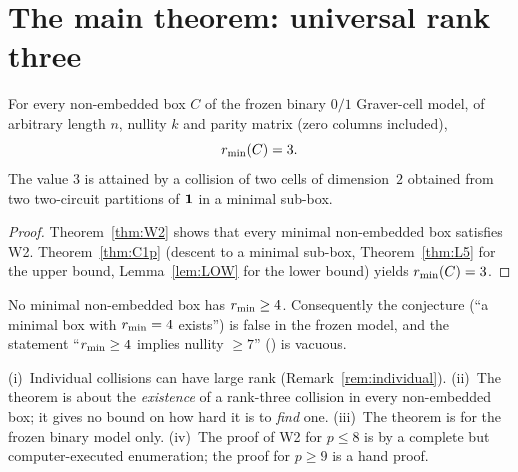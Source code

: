 
\section{The main theorem: universal rank three}\label{sec:main}

\begin{theorem}\label{thm:rank3}
For every non-embedded box $C$ of the frozen binary $0/1$ Graver-cell model, of arbitrary length $n$, nullity $k$ and parity matrix (zero columns included),
\[
r_{\min}(C)=3 .
\]
The value $3$ is attained by a collision of two cells of dimension~$2$ obtained from two two-circuit partitions of $\mathbf 1$ in a minimal sub-box.
\end{theorem}

\begin{proof}
Theorem~\ref{thm:W2} shows that every minimal non-embedded box satisfies W2. Theorem~\ref{thm:C1p} (descent to a minimal sub-box, Theorem~\ref{thm:L5} for the upper bound, Lemma~\ref{lem:LOW} for the lower bound) yields $r_{\min}(C)=3$.
\end{proof}


\begin{corollary}\label{cor:no4}
No minimal non-embedded box has $r_{\min}\ge4$. Consequently the conjecture  (``a minimal box with $r_{\min}=4$ exists'') is false in the frozen model, and the statement ``$r_{\min}\ge4$ implies nullity $\ge7$'' () is vacuous.
\end{corollary}


\begin{remark}\label{rem:notalg}
(i)~Individual collisions can have large rank (Remark~\ref{rem:individual}). (ii)~The theorem is about the \emph{existence} of a rank-three collision in every non-embedded box; it gives no bound on how hard it is to \emph{find} one. (iii)~The theorem is for the frozen binary model only. (iv)~The proof of W2 for $p\le8$ is by a complete but computer-executed enumeration; the proof for $p\ge9$ is a hand proof.
\end{remark}

